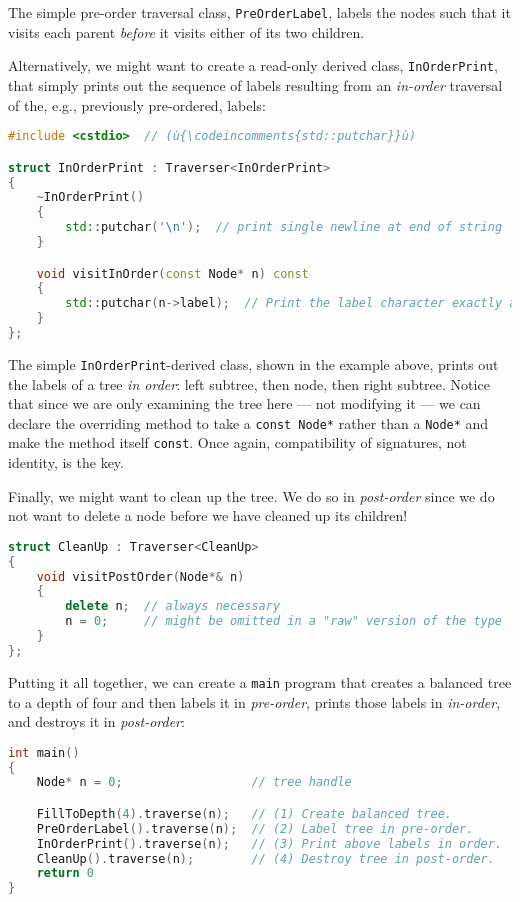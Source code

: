 \noindent The simple pre-order traversal class, \texttt{PreOrderLabel}, labels the
nodes such that it visits each parent \emph{before} it visits either of
its two children.

Alternatively, we might want to create a read-only derived class,
\texttt{InOrderPrint}, that simply prints out the sequence of labels
resulting from an \emph{in-order} traversal of the, e.g., previously
pre-ordered, labels:

\begin{lstlisting}[language=C++]
#include <cstdio>  // (ù{\codeincomments{std::putchar}}ù)

struct InOrderPrint : Traverser<InOrderPrint>
{
    ~InOrderPrint()
    {
        std::putchar('\n');  // print single newline at end of string
    }

    void visitInOrder(const Node* n) const
    {
        std::putchar(n->label);  // Print the label character exactly as is.
    }
};
\end{lstlisting}

\noindent The simple \texttt{InOrderPrint}-derived class, shown in the example above, prints out the
labels of a tree \emph{in order}: left subtree, then node, then right
subtree. Notice that since we are only examining the tree here --- not
modifying it --- we can declare the overriding method to take a
\texttt{const}~\texttt{Node*} rather than a \texttt{Node*} and make the
method itself \texttt{const}. Once again, compatibility of signatures,
not identity, is the key.

Finally, we might want to clean up the tree. We do so in
\emph{post-order} since we do not want to delete a node before we have
cleaned up its children!

\begin{lstlisting}[language=C++]
struct CleanUp : Traverser<CleanUp>
{
    void visitPostOrder(Node*& n)
    {
        delete n;  // always necessary
        n = 0;     // might be omitted in a "raw" version of the type
    }
};
\end{lstlisting}

\noindent Putting it all together, we can create a \texttt{main} program that
creates a balanced tree to a depth of four and then labels it in
\emph{pre-order}, prints those labels in \emph{in-order}, and destroys
it in \emph{post-order}:

\begin{lstlisting}[language=C++]
int main()
{
    Node* n = 0;                  // tree handle

    FillToDepth(4).traverse(n);   // (1) Create balanced tree.
    PreOrderLabel().traverse(n);  // (2) Label tree in pre-order.
    InOrderPrint().traverse(n);   // (3) Print above labels in order.
    CleanUp().traverse(n);        // (4) Destroy tree in post-order.
    return 0
}
\end{lstlisting}

